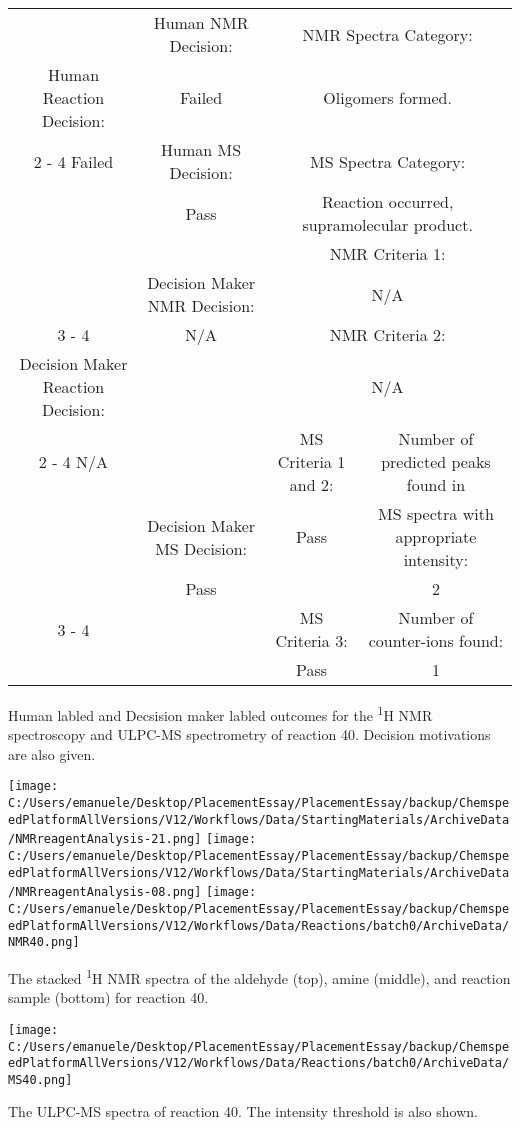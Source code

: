 \documentclass{article}%
\begin{document}
\begin{Decision Table}[H]%
\begin{tabular}{|c|c|c|c|}%
\hline%
&Human NMR Decision:&\multicolumn{2}{|c|}{NMR Spectra Category:}\\%
Human Reaction Decision:&Failed&\multicolumn{2}{|c|}{Oligomers formed.}\\%
\cline{2%
-%
4}%
Failed&Human MS Decision:&\multicolumn{2}{|c|}{MS Spectra Category:}\\%
&Pass&\multicolumn{2}{|c|}{Reaction occurred, supramolecular product.}\\%
\hline%
&&\multicolumn{2}{|c|}{NMR Criteria 1:}\\%
&Decision Maker NMR Decision:&\multicolumn{2}{|c|}{N/A}\\%
\cline{3%
-%
4}%
&N/A&\multicolumn{2}{|c|}{NMR Criteria 2:}\\%
Decision Maker Reaction Decision:&&\multicolumn{2}{|c|}{N/A}\\%
\cline{2%
-%
4}%
N/A&&MS Criteria 1 and 2:&Number of predicted peaks found in\\%
&Decision Maker MS Decision:&Pass&MS spectra with appropriate intensity:\\%
&Pass&&2\\%
\cline{3%
-%
4}%
&&MS Criteria 3:&Number of counter{-}ions found:\\%
&&Pass&1\\%
\hline%
\end{tabular}%
\caption{Human labled and Decsision maker labled outcomes for the \textsuperscript{1}H NMR spectroscopy and ULPC-MS spectrometry of reaction 40. Decision motivations are also given.}%
\end{Decision Table}%
\begin{NMR Spectra}[H]%
\begin{center}%
\texttt{[image: C:/Users/emanuele/Desktop/PlacementEssay/PlacementEssay/backup/ChemspeedPlatformAllVersions/V12/Workflows/Data/StartingMaterials/ArchiveData/NMRreagentAnalysis-21.png]}\hfill%
\texttt{[image: C:/Users/emanuele/Desktop/PlacementEssay/PlacementEssay/backup/ChemspeedPlatformAllVersions/V12/Workflows/Data/StartingMaterials/ArchiveData/NMRreagentAnalysis-08.png]}\hfill%
\texttt{[image: C:/Users/emanuele/Desktop/PlacementEssay/PlacementEssay/backup/ChemspeedPlatformAllVersions/V12/Workflows/Data/Reactions/batch0/ArchiveData/NMR40.png]}\hfill%
\end{center}%
\caption{The stacked \textsuperscript{1}H NMR spectra of the aldehyde (top), amine (middle), and reaction sample (bottom) for reaction 40.}%
\end{NMR Spectra}%
\begin{MS Spectra}[H]%
\begin{center}%
\texttt{[image: C:/Users/emanuele/Desktop/PlacementEssay/PlacementEssay/backup/ChemspeedPlatformAllVersions/V12/Workflows/Data/Reactions/batch0/ArchiveData/MS40.png]}\hfill%
\end{center}%
\caption{The ULPC-MS spectra of reaction 40. The intensity threshold is also shown.}%
\end{MS Spectra}%
\end{document}
